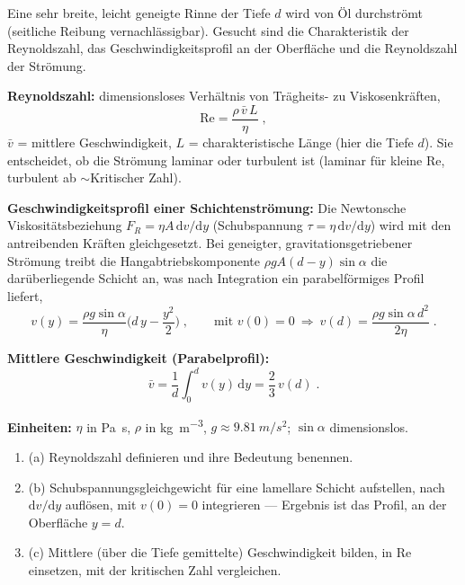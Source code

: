 

Eine sehr breite, leicht geneigte Rinne der Tiefe $d$ wird von Öl durchströmt
(seitliche Reibung vernachlässigbar). Gesucht sind die Charakteristik der
Reynoldszahl, das Geschwindigkeitsprofil an der Oberfläche und die
Reynoldszahl der Strömung.

\begin{werkzeugkasten}[Werkzeuge]
\textbf{Reynoldszahl:} dimensionsloses Verhältnis von Trägheits- zu
Viskosenkräften,
\begin{equation}
  \mathrm{Re}=\frac{\rho\, \bar v\, L}{\eta}\;,
\end{equation}
$\bar v$ = mittlere Geschwindigkeit, $L$ = charakteristische Länge (hier die
Tiefe $d$). Sie entscheidet, ob die Strömung laminar oder turbulent ist
(laminar für kleine $\mathrm{Re}$, turbulent ab $\sim$Kritischer Zahl).

\textbf{Geschwindigkeitsprofil einer Schichtenströmung:} Die Newtonsche
Viskositätsbeziehung $F_R=\eta A\,\mathrm dv/\mathrm dy$ (Schubspannung
$\tau=\eta\,\mathrm dv/\mathrm dy$) wird mit den antreibenden Kräften
gleichgesetzt. Bei geneigter, gravitationsgetriebener Strömung treibt die
Hangabtriebskomponente $\rho g A (d-y)\sin\alpha$ die darüberliegende Schicht
an, was nach Integration ein parabelförmiges Profil liefert,
\begin{equation}
  v(y)=\frac{\rho g\sin\alpha}{\eta}\Big(d\,y-\frac{y^2}{2}\Big)\;,
  \qquad \text{mit } v(0)=0\ \Rightarrow\
  v(d)=\frac{\rho g\sin\alpha\, d^2}{2\eta}\;.
\end{equation}

\textbf{Mittlere Geschwindigkeit (Parabelprofil):}
\begin{equation}
  \bar v=\frac{1}{d}\int_0^d v(y)\,\mathrm dy
  =\frac{2}{3}\,v(d)\;.
\end{equation}

\textbf{Einheiten:} $\eta$ in \unit{\pascal\second}, $\rho$ in
\unit{\kilogram\per\cubic\metre}, $g\approx\qty{9.81}{m/s^2}$; $\sin\alpha$
dimensionslos.
\end{werkzeugkasten}

\begin{werkzeugkasten}
\begin{enumerate}
  \item (a) Reynoldszahl definieren und ihre Bedeutung benennen.
  \item (b) Schubspannungsgleichgewicht für eine lamellare Schicht
       aufstellen, nach $\mathrm dv/\mathrm dy$ auflösen, mit $v(0)=0$
       integrieren --- Ergebnis ist das Profil, an der Oberfläche $y=d$.
  \item (c) Mittlere (über die Tiefe gemittelte) Geschwindigkeit bilden, in
       $\mathrm{Re}$ einsetzen, mit der kritischen Zahl vergleichen.
\end{enumerate}
\end{werkzeugkasten}

